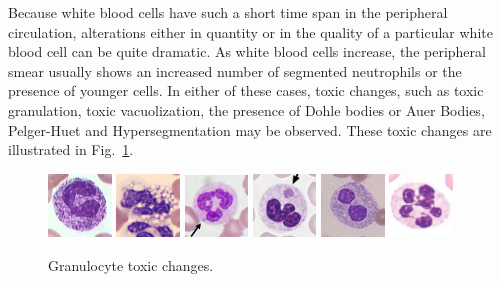 Because white blood cells have such a short time span in the peripheral circulation, alterations either in quantity or in the quality of a particular white blood cell can be quite dramatic. As white blood cells increase, the peripheral smear usually shows an increased number of segmented neutrophils or the presence of younger cells. In either of these cases, toxic changes, such as toxic granulation, toxic vacuolization, the presence of Dohle bodies or Auer Bodies, Pelger-Huet and Hypersegmentation may be observed. These toxic changes are illustrated in Fig.~\ref{fig:Changes}.


\begin{figure}[!htbp]
	\centering
	\includegraphics[width=0.15\textwidth]{images/granul}
	\includegraphics[width=0.15\textwidth]{images/vacuol}
	\includegraphics[width=0.15\textwidth]{images/Dohle}
	\includegraphics[width=0.15\textwidth]{images/Auer}
	\includegraphics[width=0.15\textwidth]{images/Pelger}
	\includegraphics[width=0.15\textwidth]{images/hyper}
	\caption{\label{fig:Changes} Granulocyte toxic changes.}
\end{figure}

